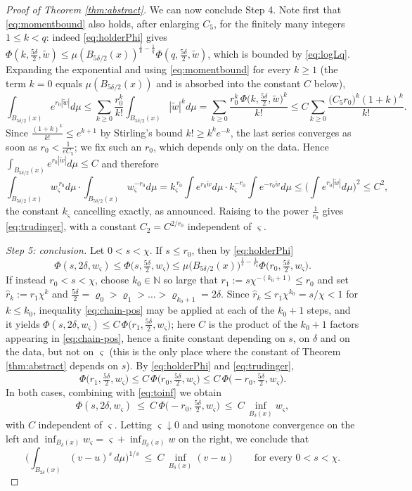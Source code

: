 \documentclass[10pt,a4paper]{amsart}
\newcommand{\N}{\mathbb{N}}
\begin{document}
\begin{proof}[Proof of Theorem \ref{thm:abstract}]
We can now conclude Step 4. Note first that \eqref{eq:momentbound} also holds, after enlarging
$C_5$, for the finitely many integers $1\le k<q$: indeed \eqref{eq:holderPhi} gives
$\Phi(k,\frac{5\delta}{2},\widetilde w)\le\mu(B_{5\delta/2}(x))^{\frac1k-\frac1q}\Phi(q,\frac{5\delta}{2},\widetilde w)$,
which is bounded by \eqref{eq:logLq}. Expanding the exponential and using \eqref{eq:momentbound}
for every $k\ge1$ (the term $k=0$ equals $\mu(B_{5\delta/2}(x))$ and is absorbed into the
constant $C$ below),
\[
\int_{B_{5\delta/2}(x)}e^{r_0|\widetilde w|}d\mu
\le\sum_{k\ge0}\frac{r_0^{k}}{k!}\int_{B_{5\delta/2}(x)}|\widetilde w|^{k}d\mu
=\sum_{k\ge0}\frac{r_0^{k}\,\Phi\big(k,\frac{5\delta}{2},\widetilde w\big)^{k}}{k!}
\le C\sum_{k\ge0}\frac{\big(C_5 r_0\big)^{k}(1+k)^{k}}{k!} .
\]
Since $\frac{(1+k)^{k}}{k!}\le e^{k+1}$ by Stirling's bound $k!\ge k^{k}e^{-k}$, the last series
converges as soon as $r_0<\frac{1}{eC_5}$; we fix such an $r_0$, which depends only on the data.
Hence $\int_{B_{5\delta/2}(x)}e^{r_0|\widetilde w|}d\mu\le C$ and therefore
\[
\int_{B_{5\delta/2}(x)}w_\varsigma^{\,r_0}d\mu\cdot\int_{B_{5\delta/2}(x)}w_\varsigma^{-r_0}d\mu
=k_\varsigma^{\,r_0}\!\int e^{r_0\widetilde w}d\mu\cdot k_\varsigma^{-r_0}\!\int e^{-r_0\widetilde w}d\mu
\le\Big(\int e^{r_0|\widetilde w|}d\mu\Big)^{2}\le C^{2} ,
\]
the constant $k_\varsigma$ cancelling exactly, as announced. Raising to the power $\frac1{r_0}$
gives \eqref{eq:trudinger}, with a constant $C_2=C^{2/r_0}$ independent of $\varsigma$.

\emph{Step 5: conclusion.} Let $0<s<\chi$. If $s\le r_0$, then by \eqref{eq:holderPhi}
\[
\Phi(s,2\delta,w_\varsigma)\le\Phi\big(s,\tfrac{5\delta}{2},w_\varsigma\big)
\le\mu\big(B_{5\delta/2}(x)\big)^{\frac1s-\frac1{r_0}}\Phi\big(r_0,\tfrac{5\delta}{2},w_\varsigma\big).
\]
If instead $r_0<s<\chi$, choose $k_0\in\N$ so large that $r_1:=s\chi^{-(k_0+1)}\le r_0$ and set
$\hat r_k:=r_1\chi^{k}$ and $\frac{5\delta}{2}=\varrho_0>\varrho_1>\dots>\varrho_{k_0+1}=2\delta$. Since
$\hat r_{k}\le r_1\chi^{k_0}=s/\chi<1$ for $k\le k_0$, inequality \eqref{eq:chain-pos} may be applied at
each of the $k_0+1$ steps, and it yields
$\Phi(s,2\delta,w_\varsigma)\le C\,\Phi\big(r_1,\frac{5\delta}{2},w_\varsigma\big)$; here $C$ is the
product of the $k_0+1$ factors appearing in \eqref{eq:chain-pos}, hence a finite constant depending
on $s$, on $\delta$ and on the data, but not on $\varsigma$ (this is the only place where the
constant of Theorem \ref{thm:abstract} depends on $s$). By
\eqref{eq:holderPhi} and \eqref{eq:trudinger},
\[
\Phi\big(r_1,\tfrac{5\delta}{2},w_\varsigma\big)\le C\,\Phi\big(r_0,\tfrac{5\delta}{2},w_\varsigma\big)
\le C\,\Phi\big(-r_0,\tfrac{5\delta}{2},w_\varsigma\big) .
\]
In both cases, combining with \eqref{eq:toinf} we obtain
\[
\Phi(s,2\delta,w_\varsigma)\ \le\ C\,\Phi\big(-r_0,\tfrac{5\delta}{2},w_\varsigma\big)
\ \le\ C\,\inf_{B_{\delta}(x)}w_\varsigma ,
\]
with $C$ independent of $\varsigma$. Letting $\varsigma\downarrow0$ and using monotone convergence
on the left and $\inf_{B_{\delta}(x)}w_\varsigma=\varsigma+\inf_{B_{\delta}(x)}w$ on the right, we
conclude that
\[
\Big(\int_{B_{2\delta}(x)}(v-u)^{s}\,d\mu\Big)^{1/s}\ \le\ C\,\inf_{B_{\delta}(x)}(v-u)
\qquad\text{for every }0<s<\chi .
\]


\end{proof}
\end{document}
